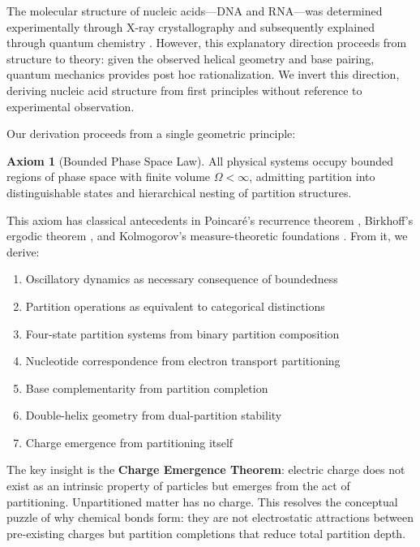 \documentclass[twocolumn,10pt,a4paper]{article}
\theoremstyle{definition}
\newtheorem{axiom}{Axiom}
\theoremstyle{remark}
\begin{document}
The molecular structure of nucleic acids---DNA and RNA---was determined experimentally through X-ray crystallography \cite{watson1953, franklin1953} and subsequently explained through quantum chemistry \cite{pullman1963}. However, this explanatory direction proceeds from structure to theory: given the observed helical geometry and base pairing, quantum mechanics provides post hoc rationalization. We invert this direction, deriving nucleic acid structure from first principles without reference to experimental observation.

Our derivation proceeds from a single geometric principle:

\begin{axiom}[Bounded Phase Space Law]
\label{ax:bounded}
All physical systems occupy bounded regions of phase space with finite volume $\Omega < \infty$, admitting partition into distinguishable states and hierarchical nesting of partition structures.
\end{axiom}

This axiom has classical antecedents in Poincar\'{e}'s recurrence theorem \cite{poincare1890}, Birkhoff's ergodic theorem \cite{birkhoff1931}, and Kolmogorov's measure-theoretic foundations \cite{kolmogorov1957}. From it, we derive:

\begin{enumerate}[label=(\roman*)]
    \item Oscillatory dynamics as necessary consequence of boundedness
    \item Partition operations as equivalent to categorical distinctions
    \item Four-state partition systems from binary partition composition
    \item Nucleotide correspondence from electron transport partitioning
    \item Base complementarity from partition completion
    \item Double-helix geometry from dual-partition stability
    \item Charge emergence from partitioning itself
\end{enumerate}

The key insight is the \textbf{Charge Emergence Theorem}: electric charge does not exist as an intrinsic property of particles but emerges from the act of partitioning. Unpartitioned matter has no charge. This resolves the conceptual puzzle of why chemical bonds form: they are not electrostatic attractions between pre-existing charges but partition completions that reduce total partition depth.
\end{document}
